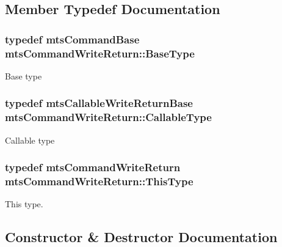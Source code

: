 \subsection{Member Typedef Documentation}
\hypertarget{classmts_command_write_return_a77f6a3a0512f7914b99f53dfe307a798}{}
\subsubsection[{Base\+Type}]{\setlength{\rightskip}{0pt plus 5cm}typedef {\bf mts\+Command\+Base} {\bf mts\+Command\+Write\+Return\+::\+Base\+Type}}\label{classmts_command_write_return_a77f6a3a0512f7914b99f53dfe307a798}
Base type \hypertarget{classmts_command_write_return_ac99dff53e64c78801540f606bb3b701b}{}
\subsubsection[{Callable\+Type}]{\setlength{\rightskip}{0pt plus 5cm}typedef {\bf mts\+Callable\+Write\+Return\+Base} {\bf mts\+Command\+Write\+Return\+::\+Callable\+Type}}\label{classmts_command_write_return_ac99dff53e64c78801540f606bb3b701b}
Callable type \hypertarget{classmts_command_write_return_a134ad936dafcef1c96fb73c9a2ff8a8d}{}
\subsubsection[{This\+Type}]{\setlength{\rightskip}{0pt plus 5cm}typedef {\bf mts\+Command\+Write\+Return} {\bf mts\+Command\+Write\+Return\+::\+This\+Type}}\label{classmts_command_write_return_a134ad936dafcef1c96fb73c9a2ff8a8d}
This type. 

\subsection{Constructor \& Destructor Documentation}
\hypertarget{classmts_command_write_return_a75d7e811da35c3d35a5381d81a723c47}{}

